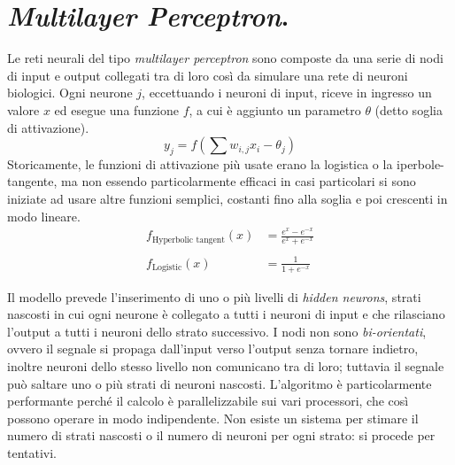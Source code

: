 \documentclass[11pt, a4page, twocolumn]{article}
\begin{document}
\section{\textit{Multilayer Perceptron}.}
Le reti neurali del tipo \textit{multilayer perceptron} sono composte da una serie di nodi di input e output collegati tra di loro così da simulare una rete di neuroni biologici.
Ogni neurone $j$, eccettuando i neuroni di input, riceve in ingresso un valore $x$ ed esegue una funzione $f$, a cui è aggiunto un parametro $\theta$ (detto soglia di attivazione).
\begin{equation*}
  y_j = f( \sum{}{}{w_{i,j} x_i - \theta_j})
\end{equation*}
Storicamente, le funzioni di attivazione più usate erano la logistica o la iperbole-tangente, ma non essendo particolarmente efficaci in casi particolari si sono iniziate ad usare altre funzioni semplici, costanti fino alla soglia e poi crescenti in modo lineare.
\begin{align*}
  f_{\text{Hyperbolic tangent}}(x) &= \frac{e^x - e^{-x}}{e^x + e^{-x}} \\ \\
  f_{\text{Logistic}}(x) &= \frac{1}{1 + e^{-x}}
\end{align*}

Il modello prevede l'inserimento di uno o più livelli di \textit{hidden neurons}, strati nascosti in cui ogni neurone è collegato a tutti i neuroni di input e che rilasciano l'output a tutti i neuroni dello strato successivo.
I nodi non sono \textit{bi-orientati}, ovvero il segnale si propaga dall'input verso l'output senza tornare indietro, inoltre neuroni dello stesso livello non comunicano tra di loro; tuttavia il segnale può saltare uno o più strati di neuroni nascosti.
L'algoritmo è particolarmente performante perché il calcolo è parallelizzabile sui vari processori, che così possono operare in modo indipendente.
Non esiste un sistema per stimare il numero di strati nascosti o il numero di neuroni per ogni strato: si procede per tentativi.
\end{document}
